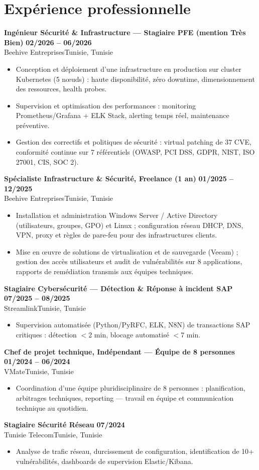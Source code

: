 \documentclass[a4paper,9pt]{article}
\newcommand{\cventry}[4]{\textbf{#1} \hfill \textbf{#4}\\[0.2pt]#2{\ifx\relax#3\relax\else, #3\fi}\par\vspace{0.3pt}}
\begin{document}
\section{Expérience professionnelle}
\cventry{Ingénieur Sécurité \& Infrastructure --- Stagiaire PFE (mention Très Bien)}{Beehive Entreprises}{Tunisie}{02/2026 -- 06/2026}
\begin{itemize}
  \item Conception et déploiement d'une infrastructure en production sur cluster Kubernetes (5 nœuds) : haute disponibilité, zéro downtime, dimensionnement des ressources, health probes.
  \item Supervision et optimisation des performances : monitoring Prometheus/Grafana + ELK Stack, alerting temps réel, maintenance préventive.
  \item Gestion des correctifs et politiques de sécurité : virtual patching de 37 CVE, conformité continue sur 7 référentiels (OWASP, PCI DSS, GDPR, NIST, ISO 27001, CIS, SOC 2).
\end{itemize}
\cventry{Spécialiste Infrastructure \& Sécurité, Freelance (1 an)}{Beehive Entreprises}{Tunisie}{01/2025 -- 12/2025}
\begin{itemize}
  \item Installation et administration Windows Server / Active Directory (utilisateurs, groupes, GPO) et Linux ; configuration réseau DHCP, DNS, VPN, proxy et règles de pare-feu pour des infrastructures clients.
  \item Mise en œuvre de solutions de virtualisation et de sauvegarde (Veeam) ; gestion des accès utilisateurs et audit de vulnérabilités sur 8 applications, rapports de remédiation transmis aux équipes techniques.
\end{itemize}
\cventry{Stagiaire Cybersécurité --- Détection \& Réponse à incident SAP}{Streamlink}{Tunisie}{07/2025 -- 08/2025}
\begin{itemize}
  \item Supervision automatisée (Python/PyRFC, ELK, N8N) de transactions SAP critiques : détection $<$2 min, blocage automatisé $<$7 min.
\end{itemize}
\cventry{Chef de projet technique, Indépendant --- Équipe de 8 personnes}{VMate}{Tunisie}{01/2024 -- 06/2024}
\begin{itemize}
  \item Coordination d'une équipe pluridisciplinaire de 8 personnes : planification, arbitrages techniques, reporting --- travail en équipe et communication technique au quotidien.
\end{itemize}
\cventry{Stagiaire Sécurité Réseau}{Tunisie Telecom}{Tunisie}{07/2024}
\begin{itemize}
  \item Analyse de trafic réseau, durcissement de configuration, identification de 10+ vulnérabilités, dashboards de supervision Elastic/Kibana.
\end{itemize}
\end{document}
